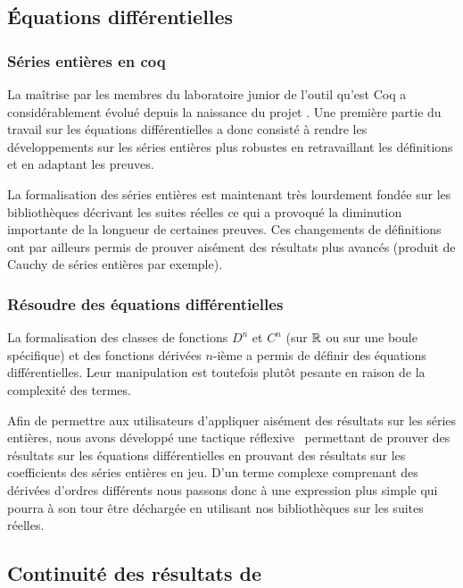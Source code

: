 \documentclass[11pt]{article}
\begin{document}
\subsection{Équations différentielles}

\subsubsection{Séries entières en coq}

La maîtrise par les membres du laboratoire junior de l'outil qu'est Coq a
considérablement évolué depuis la naissance du projet \coquille{}. Une première
partie du travail sur les équations différentielles a donc consisté à rendre les
développements sur les séries entières plus robustes en retravaillant les définitions
et en adaptant les preuves.

La formalisation des séries entières est maintenant très lourdement fondée sur les
bibliothèques décrivant les suites réelles ce qui a provoqué la diminution importante
de la longueur de certaines preuves. Ces changements de définitions ont par ailleurs
permis de prouver aisément des résultats plus avancés (produit de Cauchy de séries
entières par exemple).

\subsubsection{Résoudre des équations différentielles}

La formalisation des classes de fonctions $D^n$ et $C^n$ (sur $\mathbb{R}$ ou sur une boule
spécifique) et des fonctions dérivées $n$-ième a permis de définir des équations
différentielles. Leur manipulation est toutefois plutôt pesante en raison de la
complexité des termes.

Afin de permettre aux utilisateurs d'appliquer aisément des résultats sur les séries
entières, nous avons développé une tactique réflexive~\cite{reflection} permettant
de prouver des résultats sur les équations différentielles en prouvant des résultats
sur les coefficients des séries entières en jeu.
D'un terme complexe comprenant des dérivées d'ordres différents nous passons donc
à une expression plus simple qui pourra à son tour être déchargée en utilisant nos
bibliothèques sur les suites réelles.

\subsection{Continuité des résultats de \coquille{}}
\end{document}
